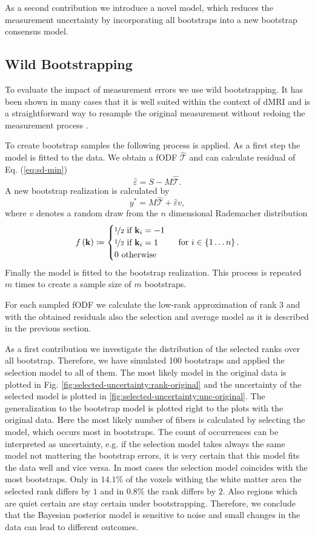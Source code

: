As a second contribution we introduce a novel model, which reduces the measurement
uncertainty by incorporating all bootstraps into a new bootstrap consensus model.

\subsection{Wild Bootstrapping}
To evaluate the impact of measurement errors we use wild bootstrapping. It
has been shown in many cases that it is well suited within the context of dMRI and
is a straightforward way to
resample the original measurement without redoing the measurement process
\cite{Jones:2008}.

To create bootstrap samples the following process is applied. As a first step the model is fitted to the data. We obtain a fODF
$\hat{\mathcal{T}}$ and can calculate residual of Eq. (\ref{eq:sd-min}) 
\[ \hat{\varepsilon} = S - M\hat{\mathcal{T}} .\] 
A new bootstrap realization is calculated by 
\[ y^{*} = M\hat{\mathcal{T}}  + \hat{\varepsilon} v , \]
where $v$ denotes a random draw from the $n$ dimensional Rademacher distribution
\[ f \left( \mathbf{k} \right) \coloneqq  \begin{cases} \nicefrac{1}{2} \text{ if }
		\mathbf{k}_i=-1 \\
		\nicefrac{1}{2} \text{ if } \mathbf{k}_i=1 \\
		0 \text { otherwise } 
\end{cases} \text{ for } i \in \left\{ 1\dots n \right\} . \]
 Finally the model is fitted to the bootstrap realization. This process is repeated $m$
times to create a sample size of $m$ bootstraps.

For each sampled fODF we calculate the low-rank approximation of rank $3$
and with the obtained residuals also the selection and average model as it is
described in the previous section.

As a first contribution we investigate the distribution of the selected ranks
over all bootstrap. Therefore, we have simulated 100 bootstraps and applied the
selection model to all of them. The most
likely model in the original data is plotted in Fig.
\ref{fig:selected-uncertainty:rank-original} and the uncertainty of the selected model is
plotted in \ref{fig:selected-uncertainty:unc-original}. The generalization to the bootstrap model is
plotted right to the plots with the original data. Here the most likely number of fibers is
calculated by selecting the model, which occurs most in bootstraps. The count of
occurrences can be interpreted as uncertainty, e.g. if the selection model takes
always the same model not mattering the bootstrap errors, it is very certain
that this model fits the data well and vice versa.  
In most cases the selection model coincides with the most bootstraps. Only in
$14.1\%$ of the voxels withing the white matter area the selected rank differs
by $1$ and in $0.8\%$ the rank differs by $2$. Also regions which are quiet
certain are stay certain under bootstrapping. Therefore, we conclude that the
Bayesian posterior model is sensitive to noise and small changes in the data can
lead to different outcomes. 

